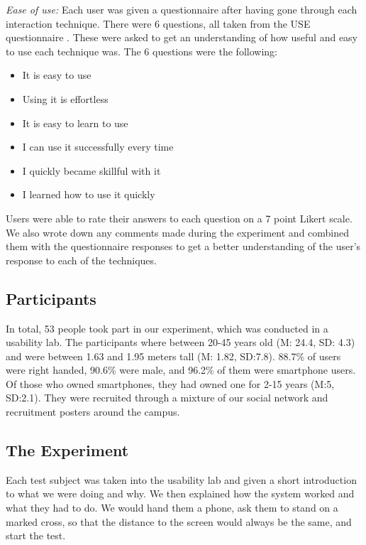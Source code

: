 \textit{Ease of use:} Each user was given a questionnaire after having gone through each interaction technique. 
There were 6 questions, all taken from the USE questionnaire \cite{lund2001measuring}. 
These were asked to get an understanding of how useful and easy to use each technique was. 
The 6 questions were the following: 

\begin{itemize}
	\item It is easy to use
	\item Using it is effortless
	\item It is easy to learn to use
	\item I can use it successfully every time
	\item I quickly became skillful with it
	\item I learned how to use it quickly
\end{itemize}

Users were able to rate their answers to each question on a 7 point Likert scale. 
We also wrote down any comments made during the experiment and combined them with the questionnaire responses to get a better understanding of the user's response to each of the techniques. 

\subsection{Participants}
In total, 53 people took part in our experiment, which was conducted in a usability lab. 
The participants where between 20-45 years old (M: 24.4, SD: 4.3) and were between 1.63 and 1.95 meters tall (M: 1.82, SD:7.8). 
88.7\% of users were right handed, 90.6\% were male, and 96.2\% of them were smartphone users. 
Of those who owned smartphones, they had owned one for 2-15 years (M:5, SD:2.1). 
They were recruited through a mixture of our social network and recruitment posters around the campus. 

\subsection{The Experiment}

Each test subject was taken into the usability lab and given a short introduction to what we were doing and why. 
We then explained how the system worked and what they had to do. 
We would hand them a phone, ask them to stand on a marked cross, so that the distance to the screen would always be the same, and start the test.

